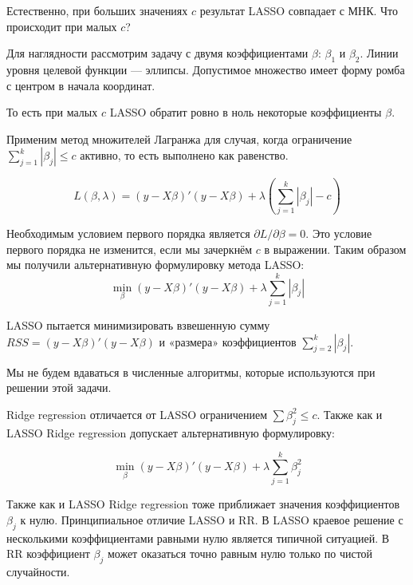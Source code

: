 \documentclass[12pt, a4paper]{article}
\begin{document}
Естественно, при больших значениях $c$ результат LASSO совпадает с МНК. Что происходит при малых $c$?


Для наглядности рассмотрим задачу с двумя коэффициентами $\beta$: $\beta_1$ и $\beta_2$. Линии уровня целевой функции — эллипсы. Допустимое множество имеет форму ромба с центром в начала координат.




То есть при малых $c$ LASSO обратит ровно в ноль некоторые коэффициенты $\beta$.


Применим метод множителей Лагранжа для случая, когда ограничение $\sum_{j=1}^{k}|\beta_j|\leq c$ активно, то есть выполнено как равенство.

\begin{equation}
L(\beta,\lambda)=(y-X\beta)'(y-X\beta)+\lambda \left(\sum_{j=1}^{k}|\beta_j| - c \right)
\end{equation}

Необходимым условием первого порядка является $\partial L/\partial \beta =0$.
Это условие первого порядка не изменится, если мы зачеркнём $c$ в выражении.
Таким образом мы получили альтернативную формулировку метода LASSO:
\begin{equation}
\min_{\beta} (y-X\beta)'(y-X\beta)+\lambda \sum_{j=1}^{k}|\beta_j|
\end{equation}

LASSO пытается минимизировать взвешенную сумму $RSS=(y-X\beta)'(y-X\beta)$ и «размера» коэффициентов $\sum_{j=2}^{k}|\beta_j|$.


Мы не будем вдаваться в численные алгоритмы, которые используются при решении этой задачи.


Ridge regression отличается от LASSO ограничением $\sum \beta_j^2\leq c$.
Также как и LASSO Ridge regression допускает альтернативную формулировку:

\begin{equation}
\min_{\beta} (y-X\beta)'(y-X\beta)+\lambda \sum_{j=1}^{k} \beta_j^2
\end{equation}

Также как и LASSO Ridge regression тоже приближает значения коэффициентов $\beta_j$ к нулю.
Принципиальное отличие LASSO и RR.
В LASSO краевое решение с несколькими коэффициентами равными нулю является типичной ситуацией.
В RR коэффициент $\beta_j$ может оказаться точно равным нулю только по чистой случайности.
\end{document}
